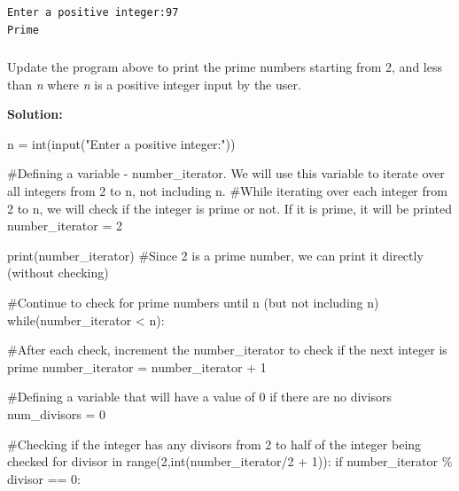 \documentclass[
  letterpaper,
  DIV=11,
  numbers=noendperiod]{scrreprt}
\newenvironment{Shaded}{\begin{snugshade}}{\end{snugshade}}
\newcommand{\BuiltInTok}[1]{\textcolor[rgb]{0.00,0.23,0.31}{#1}}
\newcommand{\CommentTok}[1]{\textcolor[rgb]{0.37,0.37,0.37}{#1}}
\newcommand{\ControlFlowTok}[1]{\textcolor[rgb]{0.00,0.23,0.31}{#1}}
\newcommand{\DecValTok}[1]{\textcolor[rgb]{0.68,0.00,0.00}{#1}}
\newcommand{\KeywordTok}[1]{\textcolor[rgb]{0.00,0.23,0.31}{#1}}
\newcommand{\NormalTok}[1]{\textcolor[rgb]{0.00,0.23,0.31}{#1}}
\newcommand{\OperatorTok}[1]{\textcolor[rgb]{0.37,0.37,0.37}{#1}}
\newcommand{\StringTok}[1]{\textcolor[rgb]{0.13,0.47,0.30}{#1}}
\begin{document}
\begin{verbatim}
Enter a positive integer:97
Prime
\end{verbatim}

\hypertarget{section-3}{%
\subsubsection{}\label{section-3}}

Update the program above to print the prime numbers starting from 2, and
less than \emph{n} where \emph{n} is a positive integer input by the
user.

\textbf{Solution:}

\begin{Shaded}
\begin{Highlighting}[]
\NormalTok{n }\OperatorTok{=} \BuiltInTok{int}\NormalTok{(}\BuiltInTok{input}\NormalTok{(}\StringTok{"Enter a positive integer:"}\NormalTok{))}

\CommentTok{\#Defining a variable {-} number\_iterator. We will use this variable to iterate over all integers from 2 to n, not including n.}
\CommentTok{\#While iterating over each integer from 2 to n, we will check if the integer is prime or not. If it is prime, it will be printed}
\NormalTok{number\_iterator }\OperatorTok{=} \DecValTok{2}

\BuiltInTok{print}\NormalTok{(number\_iterator) }\CommentTok{\#Since \textquotesingle{}2\textquotesingle{} is a prime number, we can print it directly (without checking)}

\CommentTok{\#Continue to check for prime numbers until n (but not including n)}
\ControlFlowTok{while}\NormalTok{(number\_iterator }\OperatorTok{\textless{}}\NormalTok{ n):}
    
    \CommentTok{\#After each check, increment the number\_iterator to check if the next integer is prime}
\NormalTok{    number\_iterator }\OperatorTok{=}\NormalTok{ number\_iterator }\OperatorTok{+} \DecValTok{1}
    
    \CommentTok{\#Defining a variable that will have a value of 0 if there are no divisors}
\NormalTok{    num\_divisors }\OperatorTok{=} \DecValTok{0}
    
    \CommentTok{\#Checking if the integer has any divisors from 2 to half of the integer being checked }
    \ControlFlowTok{for}\NormalTok{ divisor }\KeywordTok{in} \BuiltInTok{range}\NormalTok{(}\DecValTok{2}\NormalTok{,}\BuiltInTok{int}\NormalTok{(number\_iterator}\OperatorTok{/}\DecValTok{2} \OperatorTok{+} \DecValTok{1}\NormalTok{)):}
        \ControlFlowTok{if}\NormalTok{ number\_iterator }\OperatorTok{\%}\NormalTok{ divisor }\OperatorTok{==} \DecValTok{0}\NormalTok{:}
            

\end{Highlighting}
\end{Shaded}
\end{document}
